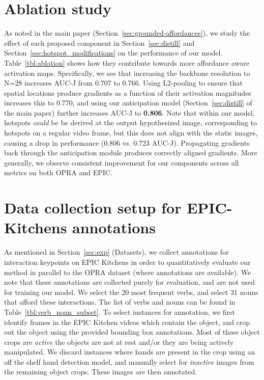 \documentclass[10pt,twocolumn,letterpaper]{article}
\newcommand{\reftbl}[1]{Table~\ref{#1}}
\newcommand{\refsec}[1]{Section~\ref{#1}}
\begin{document}
\section{Ablation study} \label{sec:ablation}
As noted in the main paper (\refsec{sec:grounded-affordances}), we study the effect of each proposed component in \refsec{sec:distill} and \refsec{sec:hotspot_modifications} on the performance of our model. \reftbl{tbl:ablation} shows how they contribute towards more affordance aware activation maps. Specifically, we see that increasing the backbone resolution to N=28 increases AUC-J from 0.707 to 0.766. Using L2-pooling to ensure that spatial locations produce gradients as a function of their activation magnitudes increases this to 0.770, and using our anticipation model (\refsec{sec:distill} of the main paper) further increases AUC-J to \textbf{0.806}.
Note that within our model, hotspots \emph{could} be be derived at the output hypothesized image, corresponding to hotspots on a regular video frame, but this does not align with the static images, causing a drop in performance (0.806 vs. 0.723 AUC-J). Propagating gradients back through the anticipation module produces correctly aligned gradients. 
More generally, we observe consistent improvement for our components across all metrics on both OPRA and EPIC. 


\section{Data collection setup for EPIC-Kitchens annotations} \label{sec:annotation}
As mentioned in \refsec{sec:exp} (Datasets), we collect annotations for interaction keypoints on EPIC Kitchens in order to quantitatively evaluate our method in parallel to the OPRA dataset (where annotations are available). We note that these annotations are collected purely for evaluation, and are not used for training our model. We select the 20 most frequent verbs, and select 31 nouns that afford these interactions. The list of verbs and nouns can be found in \reftbl{tbl:verb_noun_subset}. To select instances for annotation, we first identify frames in the EPIC Kitchen videos which contain the object, and crop out the object using the provided bounding box annotations. Most of these object crops are \emph{active} \ie the objects are not at rest and/or they are being actively manipulated. We discard instances where hands are present in the crop using an off the shelf hand detection model, and manually select for 
\emph{inactive} images from the remaining object crops. These images are then annotated.
\end{document}
